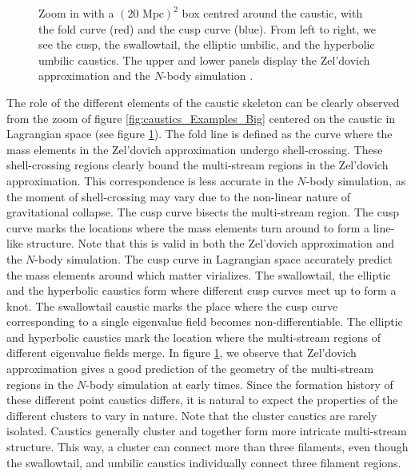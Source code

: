 \documentclass[a4paper, 11pt]{article}
\begin{document}
\begin{figure}
\begin{subfigure}[b]{0.24\textwidth}
\end{subfigure}
\caption{Zoom in with a $(20 \text{ Mpc})^2$ box centred around the caustic, with the fold curve (red) and the cusp curve (blue). From left to right, we see the cusp, the swallowtail, the elliptic umbilic, and the hyperbolic umbilic caustics. The upper and lower panels display the Zel'dovich approximation and the $N$-body simulation \cite{Hidding:2020}.}\label{fig:caustics_Examples_Small}
\end{figure}


The role of the different elements of the caustic skeleton can be clearly observed from the zoom of figure \ref{fig:caustics_Examples_Big} centered on the caustic in Lagrangian space (see figure \ref{fig:caustics_Examples_Small}). The fold line is defined as the curve where the mass elements in the Zel'dovich approximation undergo shell-crossing. These shell-crossing regions clearly bound the multi-stream regions in the Zel'dovich approximation. This correspondence is less accurate in the $N$-body simulation, as the moment of shell-crossing may vary due to the non-linear nature of gravitational collapse. The cusp curve bisects the multi-stream region. The cusp curve marks the locations where the mass elements turn around to form a line-like structure. Note that this is valid in both the Zel'dovich approximation and the $N$-body simulation. The cusp curve in Lagrangian space accurately predict the mass elements around which matter virializes. The swallowtail, the elliptic and the hyperbolic caustics form where different cusp curves meet up to form a knot. The swallowtail caustic marks the place where the cusp curve corresponding to a single eigenvalue field becomes non-differentiable. The elliptic and hyperbolic caustics mark the location where the multi-stream regions of different eigenvalue fields merge. In figure \ref{fig:caustics_Examples_Small}, we observe that Zel'dovich approximation gives a good prediction of the geometry of the multi-stream regions in the $N$-body simulation at early times. Since the formation history of these different point caustics differs, it is natural to expect the properties of the different clusters to vary in nature. Note that the cluster caustics are rarely isolated. Caustics generally cluster and together form more intricate multi-stream structure. This way, a cluster can connect more than three filaments, even though the swallowtail, and umbilic caustics individually connect three filament regions.



\end{document}
